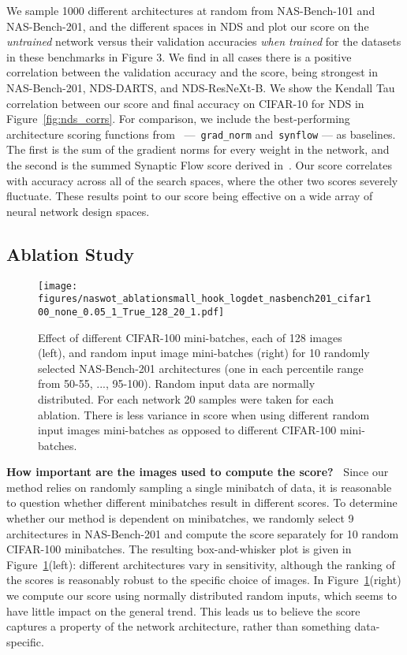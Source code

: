 \documentclass{article}
\begin{document}
We sample 1000 different architectures at random from NAS-Bench-101 and NAS-Bench-201, and the different spaces in NDS and plot our score on the {\it untrained} network versus their validation accuracies {\it when trained} for the datasets in these benchmarks in Figure 3.
We find in all cases there is a positive correlation between the validation accuracy and the score, being strongest in NAS-Bench-201, NDS-DARTS, and NDS-ResNeXt-B. We show the Kendall Tau correlation between our score and final accuracy on CIFAR-10 for NDS in Figure~\ref{fig:nds_corrs}. For comparison, we include the best-performing architecture scoring functions from~\cite{abdelfattah2021zerocost} ---~\texttt{grad\_norm} and~\texttt{synflow} --- as baselines. The first is the sum of the gradient norms for every weight in the network, and the second is the summed Synaptic Flow score derived in~\cite{tanaka2020pruning}. Our score correlates with accuracy across all of the search spaces, where the other two scores severely fluctuate. These results point to our score being effective on a wide array of neural network design spaces.


\subsection{Ablation Study}
\label{sec:ablation}
\begin{figure}[!t]
    

  \centering
  \texttt{[image: figures/naswot\_ablationsmall\_hook\_logdet\_nasbench201\_cifar100\_none\_0.05\_1\_True\_128\_20\_1.pdf]}

\caption{Effect of different CIFAR-100 mini-batches, each of 128 images (left), and random input image mini-batches (right) for 10 randomly selected NAS-Bench-201 architectures (one in each  percentile range from 50-55, ..., 95-100). Random input data are normally distributed. For each network 20 samples were taken for each ablation. There is less variance in score when using different random input images mini-batches as opposed to different CIFAR-100 mini-batches.}
\label{fig:ablation}

\end{figure}


\textbf{How important are the images used to compute the score?\ } Since our method relies on randomly sampling a single minibatch of data, it is reasonable to question whether different minibatches result in different scores. To determine whether our method is dependent on minibatches, we randomly select 9 architectures in NAS-Bench-201 and compute the score separately for 10 random CIFAR-100 minibatches. The resulting box-and-whisker plot is given in Figure~\ref{fig:ablation}(left): different architectures vary in sensitivity, although the ranking of the scores is reasonably robust to the specific choice of images. In Figure~\ref{fig:ablation}(right) we compute our score using normally distributed random inputs, which seems to have little impact on the general trend. This leads us to believe the score captures a property of the network architecture, rather than something data-specific.
\end{document}

